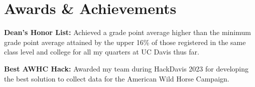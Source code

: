 \documentclass[letterpaper,12pt]{article}
\newcommand{\resumeSubHeadingListStart}{\begin{itemize}[leftmargin=0.15in, label={}]}
\newcommand{\resumeSubHeadingListEnd}{\end{itemize}}
\begin{document}

 \section{Awards \& Achievements}
   \vspace{2pt}
   \resumeSubHeadingListStart
     \small{\item{
         \textbf{Dean's Honor List: }{Achieved a grade point average higher than the minimum grade point average attained by the upper 16\% of those registered in the same class level and college for all my quarters at UC Davis thus far.} \\ \vspace{3pt}
        
         \textbf{Best AWHC Hack:}{ Awarded my team during HackDavis 2023 for developing the best solution to collect data for the American Wild Horse Campaign.} \\ \vspace{3pt}
              }}
   \resumeSubHeadingListEnd



\end{document}
